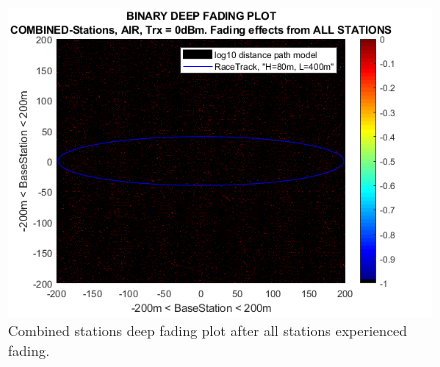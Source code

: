 \begin{figure}[H]
	\centering
	\includegraphics[width=\linewidth]{theory/fading/fig/binaryDeepFading_combinedStations_allStations.png}
	\caption{Combined stations deep fading plot after all stations experienced fading.}
	\label{fig:binaryDeepFading_combinedStations_allStations}
\end{figure}

